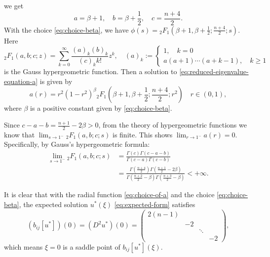 \documentclass[reqno]{amsart}
\theoremstyle{remark}
\newtheorem{remark}[theorem]{Remark}
\theoremstyle{definition}
\numberwithin{equation}{section}
\begin{document}
we get 
\begin{equation}
    a = \beta + 1, \quad b=\beta + \frac{1}{2}, \quad c = \frac{n+4}{2}.
\end{equation}
With the choice \eqref{eq:choice-beta}, we have \(\phi(s) = {}_2F_1\left(\beta + 1, \beta + \frac{1}{2}; \frac{n+4}{2} ; s\right)\). Here 
\[ {}_2F_1(a, b; c; z) = \sum_{k=0}^\infty \frac{(a)_k (b)_k}{(c)_k k!} z^k , \quad (a)_k := \begin{cases}
    1 ,\quad k=0 \\ a(a+1)\cdots(a+k-1),\quad k\geqslant 1 
\end{cases}  \]
is the Gauss hypergeometric function. Then a solution to \eqref{eq:reduced-eigenvalue-equation-a} is given by 
\begin{equation}\label{eq:choice-of-a}
    a(r) = r^2(1-r^2)^\beta {}_2F_1\left(\beta + 1, \beta + \frac{1}{2}; \frac{n+4}{2} ; r^2\right) \quad r\in (0,1),
\end{equation}
where \(\beta\) is a positive constant given by \eqref{eq:choice-beta}.
\par Since \(c-a-b = \frac{n+1}{2} - 2\beta > 0\), from the theory of hypergeometric functions we know that \(\lim_{s\to 1^-}{}_2F_1(a,b;c;s)\) is finite. This shows \(\lim_{r\to 1^-}a(r) = 0\). Specifically, by Gauss's hypergeometric formula:
\begin{equation}
    \begin{aligned}
        \lim_{s\to 1^-}{}_2F_1(a,b;c;s) &= \frac{\Gamma(c)\Gamma(c-a-b)}{\Gamma(c-a)\Gamma(c-b)} \\
        &= \frac{\Gamma(\frac{n+4}{2})\Gamma(\frac{n+1}{2} - 2\beta)}{\Gamma(\frac{n+2}{2}-\beta)\Gamma(\frac{n+3}{2}-\beta)} < +\infty.
    \end{aligned}
\end{equation}


It is clear that with the radial function \eqref{eq:choice-of-a} and the choice \eqref{eq:choice-beta}, the expected solution \(u^*(\xi)\) \eqref{eq:expected-form} satisfies  
\begin{equation}\label{minus}
    (b_{ij}[u^*])(0) = (D^2 u^*)(0) = \begin{pmatrix}
        2(n-1) &   &   &  \\
               & -2&   &  \\
               &   & \ddots&  \\
               &   &   & -2
    \end{pmatrix},
\end{equation}
which means \(\xi=0\) is a saddle point of \(b_{ij}[u^*](\xi)\). 
\end{document}
